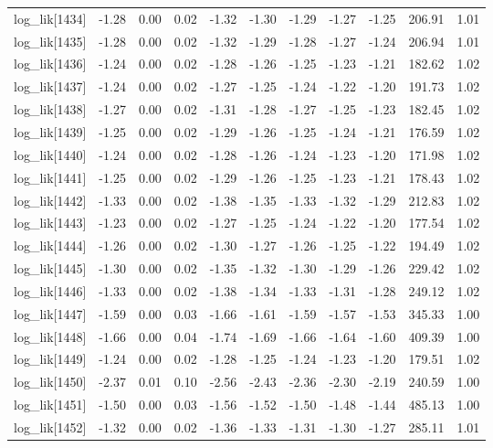 \begin{table}[ht]
\begin{tabular}{rrrrrrrrrrr}
  log\_lik[1434] & -1.28 & 0.00 & 0.02 & -1.32 & -1.30 & -1.29 & -1.27 & -1.25 & 206.91 & 1.01 \\ 
  log\_lik[1435] & -1.28 & 0.00 & 0.02 & -1.32 & -1.29 & -1.28 & -1.27 & -1.24 & 206.94 & 1.01 \\ 
  log\_lik[1436] & -1.24 & 0.00 & 0.02 & -1.28 & -1.26 & -1.25 & -1.23 & -1.21 & 182.62 & 1.02 \\ 
  log\_lik[1437] & -1.24 & 0.00 & 0.02 & -1.27 & -1.25 & -1.24 & -1.22 & -1.20 & 191.73 & 1.02 \\ 
  log\_lik[1438] & -1.27 & 0.00 & 0.02 & -1.31 & -1.28 & -1.27 & -1.25 & -1.23 & 182.45 & 1.02 \\ 
  log\_lik[1439] & -1.25 & 0.00 & 0.02 & -1.29 & -1.26 & -1.25 & -1.24 & -1.21 & 176.59 & 1.02 \\ 
  log\_lik[1440] & -1.24 & 0.00 & 0.02 & -1.28 & -1.26 & -1.24 & -1.23 & -1.20 & 171.98 & 1.02 \\ 
  log\_lik[1441] & -1.25 & 0.00 & 0.02 & -1.29 & -1.26 & -1.25 & -1.23 & -1.21 & 178.43 & 1.02 \\ 
  log\_lik[1442] & -1.33 & 0.00 & 0.02 & -1.38 & -1.35 & -1.33 & -1.32 & -1.29 & 212.83 & 1.02 \\ 
  log\_lik[1443] & -1.23 & 0.00 & 0.02 & -1.27 & -1.25 & -1.24 & -1.22 & -1.20 & 177.54 & 1.02 \\ 
  log\_lik[1444] & -1.26 & 0.00 & 0.02 & -1.30 & -1.27 & -1.26 & -1.25 & -1.22 & 194.49 & 1.02 \\ 
  log\_lik[1445] & -1.30 & 0.00 & 0.02 & -1.35 & -1.32 & -1.30 & -1.29 & -1.26 & 229.42 & 1.02 \\ 
  log\_lik[1446] & -1.33 & 0.00 & 0.02 & -1.38 & -1.34 & -1.33 & -1.31 & -1.28 & 249.12 & 1.02 \\ 
  log\_lik[1447] & -1.59 & 0.00 & 0.03 & -1.66 & -1.61 & -1.59 & -1.57 & -1.53 & 345.33 & 1.00 \\ 
  log\_lik[1448] & -1.66 & 0.00 & 0.04 & -1.74 & -1.69 & -1.66 & -1.64 & -1.60 & 409.39 & 1.00 \\ 
  log\_lik[1449] & -1.24 & 0.00 & 0.02 & -1.28 & -1.25 & -1.24 & -1.23 & -1.20 & 179.51 & 1.02 \\ 
  log\_lik[1450] & -2.37 & 0.01 & 0.10 & -2.56 & -2.43 & -2.36 & -2.30 & -2.19 & 240.59 & 1.00 \\ 
  log\_lik[1451] & -1.50 & 0.00 & 0.03 & -1.56 & -1.52 & -1.50 & -1.48 & -1.44 & 485.13 & 1.00 \\ 
  log\_lik[1452] & -1.32 & 0.00 & 0.02 & -1.36 & -1.33 & -1.31 & -1.30 & -1.27 & 285.11 & 1.01 \\ 

\end{tabular}
\end{table}
